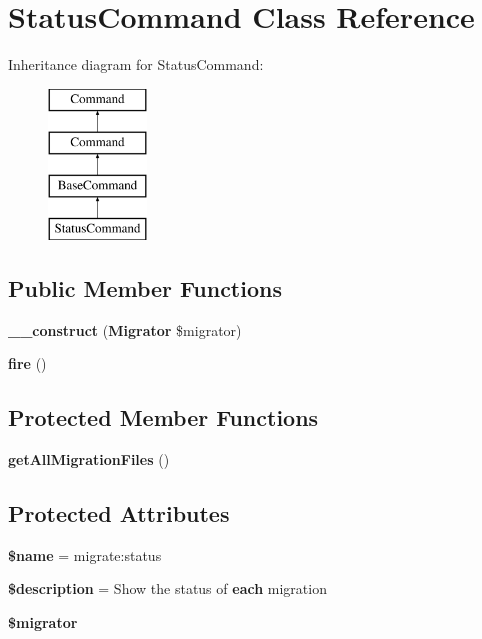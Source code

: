 \section{Status\+Command Class Reference}
\label{class_illuminate_1_1_database_1_1_console_1_1_migrations_1_1_status_command}
Inheritance diagram for Status\+Command\+:\begin{figure}[H]
\begin{center}
\leavevmode
\includegraphics[height=4.000000cm]{class_illuminate_1_1_database_1_1_console_1_1_migrations_1_1_status_command}
\end{center}
\end{figure}
\subsection*{Public Member Functions}
\begin{DoxyCompactItemize}
\item 
{\bf \+\_\+\+\_\+construct} ({\bf Migrator} \$migrator)
\item 
{\bf fire} ()
\end{DoxyCompactItemize}
\subsection*{Protected Member Functions}
\begin{DoxyCompactItemize}
\item 
{\bf get\+All\+Migration\+Files} ()
\end{DoxyCompactItemize}
\subsection*{Protected Attributes}
\begin{DoxyCompactItemize}
\item 
{\bf \$name} = \textquotesingle{}migrate\+:status\textquotesingle{}
\item 
{\bf \$description} = \textquotesingle{}Show the status of {\bf each} migration\textquotesingle{}
\item 
{\bf \$migrator}
\end{DoxyCompactItemize}


